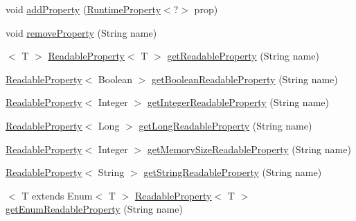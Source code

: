\begin{DoxyCompactItemize}
\item 
void \mbox{\hyperlink{interfacecom_1_1mysql_1_1cj_1_1conf_1_1_property_set_aa3494caf662b2b4b83115e0c46c6c6bf}{add\+Property}} (\mbox{\hyperlink{interfacecom_1_1mysql_1_1cj_1_1conf_1_1_runtime_property}{Runtime\+Property}}$<$?$>$ prop)
\item 
void \mbox{\hyperlink{interfacecom_1_1mysql_1_1cj_1_1conf_1_1_property_set_a16cbf9f5d52969d0dbd690c5d43e1c46}{remove\+Property}} (String name)
\item 
$<$ T $>$ \mbox{\hyperlink{interfacecom_1_1mysql_1_1cj_1_1conf_1_1_readable_property}{Readable\+Property}}$<$ T $>$ \mbox{\hyperlink{interfacecom_1_1mysql_1_1cj_1_1conf_1_1_property_set_ad9a13aa18068c412578a86b8afd619f0}{get\+Readable\+Property}} (String name)
\item 
\mbox{\hyperlink{interfacecom_1_1mysql_1_1cj_1_1conf_1_1_readable_property}{Readable\+Property}}$<$ Boolean $>$ \mbox{\hyperlink{interfacecom_1_1mysql_1_1cj_1_1conf_1_1_property_set_ac6b1377e1f71ba2facdf6d206264586e}{get\+Boolean\+Readable\+Property}} (String name)
\item 
\mbox{\hyperlink{interfacecom_1_1mysql_1_1cj_1_1conf_1_1_readable_property}{Readable\+Property}}$<$ Integer $>$ \mbox{\hyperlink{interfacecom_1_1mysql_1_1cj_1_1conf_1_1_property_set_a95fdeed14f959c79664ea5814608c17b}{get\+Integer\+Readable\+Property}} (String name)
\item 
\mbox{\hyperlink{interfacecom_1_1mysql_1_1cj_1_1conf_1_1_readable_property}{Readable\+Property}}$<$ Long $>$ \mbox{\hyperlink{interfacecom_1_1mysql_1_1cj_1_1conf_1_1_property_set_a33a32415fb023b197006630115166ad4}{get\+Long\+Readable\+Property}} (String name)
\item 
\mbox{\hyperlink{interfacecom_1_1mysql_1_1cj_1_1conf_1_1_readable_property}{Readable\+Property}}$<$ Integer $>$ \mbox{\hyperlink{interfacecom_1_1mysql_1_1cj_1_1conf_1_1_property_set_a0eca5d050976ad2291e7ac05bc8f4bf6}{get\+Memory\+Size\+Readable\+Property}} (String name)
\item 
\mbox{\hyperlink{interfacecom_1_1mysql_1_1cj_1_1conf_1_1_readable_property}{Readable\+Property}}$<$ String $>$ \mbox{\hyperlink{interfacecom_1_1mysql_1_1cj_1_1conf_1_1_property_set_ada03117e402138c98ba25e336e83d9a2}{get\+String\+Readable\+Property}} (String name)
\item 
$<$ T extends Enum$<$ T $>$ \mbox{\hyperlink{interfacecom_1_1mysql_1_1cj_1_1conf_1_1_readable_property}{Readable\+Property}}$<$ T $>$ \mbox{\hyperlink{interfacecom_1_1mysql_1_1cj_1_1conf_1_1_property_set_a01113d885888a4c9a4ac334af5f2deae}{get\+Enum\+Readable\+Property}} (String name)

\end{DoxyCompactItemize}
